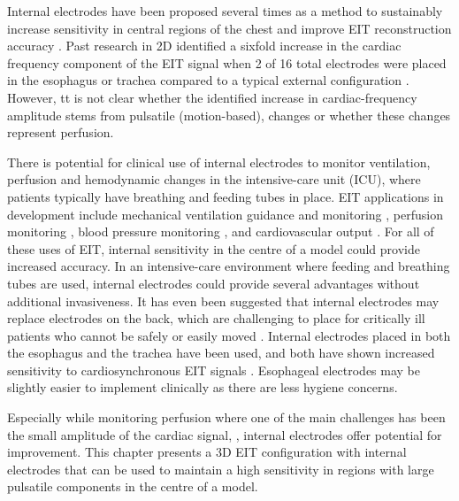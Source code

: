 

Internal electrodes have been proposed several times as a method to 
sustainably increase sensitivity in central regions of the 
chest and improve EIT reconstruction 
accuracy \parencite{pilkington_utilization_1989,schuessler_utility_1995,nasehi_tehrani_evaluation_2012, 
czaplik_application_2014,nguyen_electrical_2020}.
Past research in 2D identified a sixfold increase in the cardiac frequency 
component of the EIT signal 
when 2 of 16 total electrodes were placed in the 
esophagus or trachea compared to a typical external configuration
\parencite{czaplik_application_2014}. However, tt is not clear whether 
the identified increase in cardiac-frequency amplitude stems from pulsatile 
(motion-based), changes or whether these changes represent 
perfusion.

There is potential for clinical use of internal electrodes 
to monitor ventilation, perfusion and 
hemodynamic changes in the 
intensive-care unit (ICU), where patients typically have
breathing and feeding tubes in place.
EIT applications in development include mechanical ventilation 
guidance and monitoring \parencite{frerichs_chest_2017}, perfusion 
monitoring \parencite{frerichs_regional_2002,smit_electrical_2003}, 
blood pressure monitoring \parencite{sola_non-invasive_2011,proenca_noninvasive_2017}, 
and cardiovascular output \parencite{braun_accuracy_2018}. 
For all of these uses of EIT, internal sensitivity in the centre of 
a model could provide increased accuracy. 
In an 
intensive-care environment where feeding and breathing tubes 
are used, internal electrodes could provide 
several advantages without additional invasiveness. 
It has even been suggested that internal electrodes may replace 
electrodes on the back, which are challenging to place for critically 
ill patients who cannot be safely or easily 
moved \parencite{czaplik_application_2014}.
Internal electrodes placed in both the esophagus and the trachea
have been used, and both have shown increased sensitivity to cardiosynchronous
EIT signals \parencite{czaplik_application_2014}. 
Esophageal electrodes may be slightly easier to implement 
clinically as there are less hygiene concerns.

Especially while monitoring perfusion where one of the main challenges
has been the small amplitude of the cardiac signal,
\parencite{nguyen_review_2012}, internal electrodes offer
potential for improvement.
This chapter presents a 3D EIT configuration with internal electrodes
that can be used to maintain a high sensitivity in regions with 
large pulsatile components in the centre of a model.

